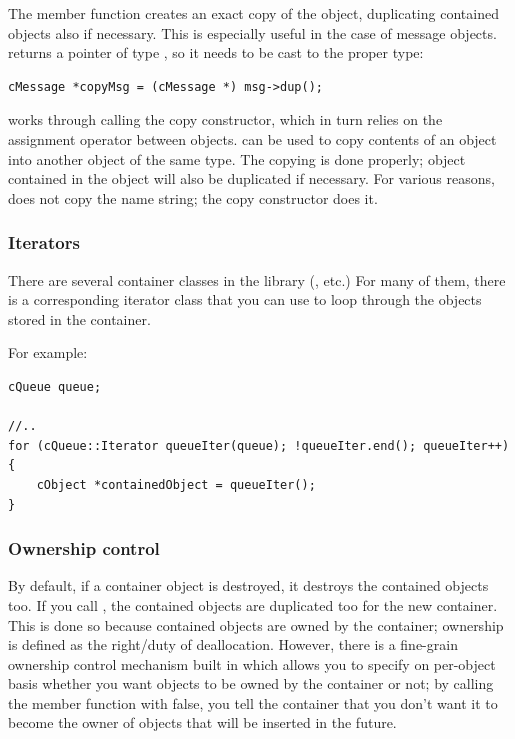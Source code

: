 The  member function creates an exact copy of the
object, duplicating
contained objects also if necessary. This is especially useful in the
case of message objects.  returns a pointer of type
, so it needs to be cast to the proper type:

\begin{verbatim}
cMessage *copyMsg = (cMessage *) msg->dup();
\end{verbatim}


 works through calling the copy constructor, which in
turn relies on the assignment operator between objects.
 can be used to copy contents of an object into
another object of the same type. The copying is done properly; object
contained in the object will also be duplicated if necessary. For
various reasons,  does not copy the name string;
the copy constructor does it.


\subsubsection{Iterators}


There are several container classes in the library (,
 etc.) For many of them, there is a corresponding
iterator class that you can use to loop through the objects stored in
the container.

For example:

\begin{verbatim}
cQueue queue;

//..
for (cQueue::Iterator queueIter(queue); !queueIter.end(); queueIter++)
{
    cObject *containedObject = queueIter();
}
\end{verbatim}


\subsubsection{Ownership control}


By default, if a container object is destroyed, it destroys the
contained objects too. If you call , the contained
objects are duplicated too for the new container. This is done so
because contained objects are owned by the container; ownership is
defined as the right/duty of deallocation. However, there is a
fine-grain ownership control mechanism built
in which allows you to specify on per-object basis whether you want
objects to be owned by the container or not; by calling the
 member function with false, you tell the
container that you don't want it to become the owner of objects that
will be inserted in the future.

